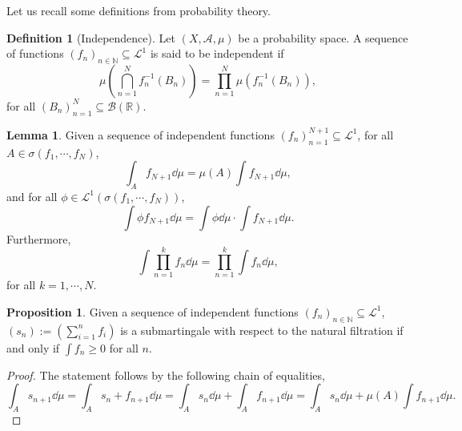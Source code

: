 \documentclass[]{article}
\theoremstyle{definition}
\theoremstyle{definition}
\newtheorem{definition}{Definition}[section]
\newtheorem{lemma}{Lemma}[section]
\newtheorem{proposition}{Proposition}[section]
\begin{document}
Let us recall some definitions from probability theory.

\begin{definition}[Independence]
  Let \((X, \mathcal{A}, \mu)\) be a probability space. A sequence of 
  functions \((f_n)_{n \in \mathbb{N}} \subseteq \mathcal{L}^1\) is said to be 
  independent if 
  \[\mu\left(\bigcap_{n = 1}^N f_n^{-1}(B_n)\right) = 
    \prod_{n = 1}^N\mu(f_n^{-1}(B_n)),\]
  for all \((B_n)_{n = 1}^N \subseteq \mathcal{B}(\mathbb{R})\).
\end{definition}

\begin{lemma}
  Given a sequence of independent functions \((f_n)_{n = 1}^{N + 1} 
  \subseteq \mathcal{L}^1\), for all \(A \in \sigma(f_1, \cdots, f_N)\),
  \[\int_A f_{N+ 1} \dd \mu = \mu(A) \int f_{N + 1} \dd \mu,\]
  and for all \(\phi \in \mathcal{L}^1(\sigma(f_1, \cdots, f_N))\),  
  \[\int \phi f_{N + 1} \dd\mu = \int \phi \dd\mu \cdot\int f_{N + 1}\dd\mu.\]
  Furthermore, 
  \[\int \prod_{n = 1}^k f_n \dd \mu = \prod_{n = 1}^k \int f_n \dd \mu,\]
  for all \(k = 1, \cdots, N\).
\end{lemma}

\begin{proposition}
  Given a sequence of independent functions \((f_n)_{n \in \mathbb{N}} 
  \subseteq \mathcal{L}^1\), \((s_n) := \left(\sum_{i = 1}^n f_i\right)\) is 
  a submartingale with respect to the natural filtration if and only if 
  \(\int f_n \ge 0\) for all \(n\).
\end{proposition}
\begin{proof}
  The statement follows by the following chain of equalities,
  \[\int_A s_{n + 1} \dd \mu = \int_A s_n + f_{n + 1} \dd \mu = 
    \int_A s_n \dd \mu + \int_A f_{n + 1} \dd \mu = 
    \int_A s_n \dd \mu + \mu(A) \int f_{n + 1} \dd \mu.\] 
\end{proof}
\end{document}
